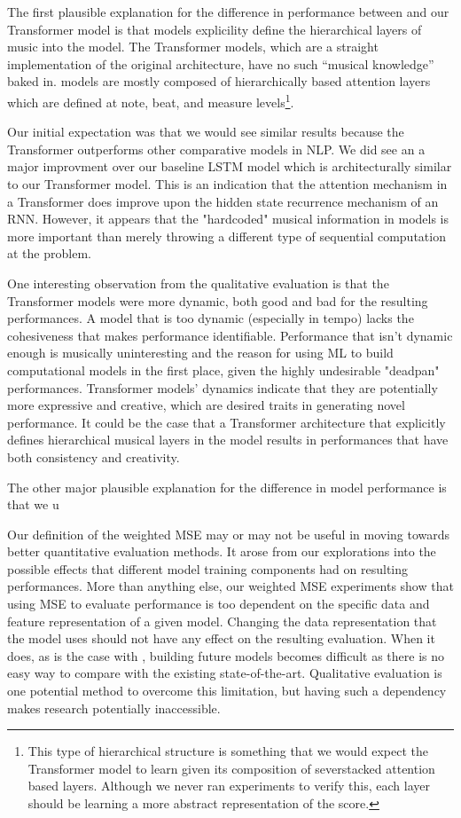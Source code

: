 The first plausible explanation for the difference in performance between \vnet{} and our Transformer model is that \vnet{} models explicility define the hierarchical layers of music into the model. The Transformer models, which are a straight implementation of the original architecture, have no such ``musical knowledge'' baked in. \vnet{} models are mostly composed of hierarchically based attention layers which are defined at note, beat, and measure levels\footnote{This type of hierarchical structure is something that we would expect the Transformer model to learn given its composition of severstacked attention based layers. Although we never ran experiments to verify this, each layer should be learning a more abstract representation of the score.}. 

Our initial expectation was that we would see similar results because the Transformer outperforms other comparative models in NLP. We did see an a major improvment over our baseline LSTM model which is architecturally similar to our Transformer model. This is an indication that the attention mechanism in a Transformer does improve upon the hidden state recurrence mechanism of an RNN. However, it appears that the "hardcoded" musical information in \vnet{} models is more important than merely throwing a different type of sequential computation at the problem.

One interesting observation from the qualitative evaluation is that the Transformer models were more dynamic, both good and bad for the resulting performances. A model that is too dynamic (especially in tempo) lacks the cohesiveness that makes performance identifiable. Performance that isn't dynamic enough is musically uninteresting and the reason for using ML to build computational models in the first place, given the highly undesirable "deadpan" performances. Transformer models' dynamics indicate that they are potentially more expressive and creative, which are desired traits in generating novel performance. It could be the case that a Transformer architecture that explicitly defines hierarchical musical layers in the model results in performances that have both consistency and creativity. 

The other major plausible explanation for the difference in model performance is that we u

Our definition of the weighted MSE may or may not be useful in moving towards better quantitative evaluation methods. It arose from our explorations into the possible effects that different model training components had on resulting performances. More than anything else, our weighted MSE experiments show that using MSE to evaluate performance is too dependent on the specific data and feature representation of a given model. Changing the data representation that the model uses should not have any effect on the resulting evaluation. When it does, as is the case with \vnet{}, building future models becomes difficult as there is no easy way to compare with the existing state-of-the-art. Qualitative evaluation is one potential method to overcome this limitation, but having such a dependency makes research potentially inaccessible.  

